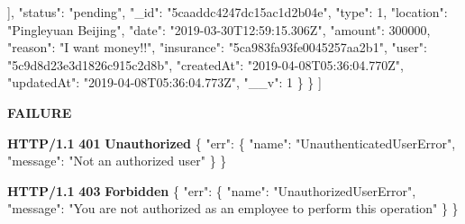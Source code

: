 \documentclass[
]{article}
\newenvironment{Shaded}{}{}
\newcommand{\DataTypeTok}[1]{\textcolor[rgb]{0.56,0.13,0.00}{#1}}
\newcommand{\DecValTok}[1]{\textcolor[rgb]{0.25,0.63,0.44}{#1}}
\newcommand{\ErrorTok}[1]{\textcolor[rgb]{1.00,0.00,0.00}{\textbf{#1}}}
\newcommand{\FunctionTok}[1]{\textcolor[rgb]{0.02,0.16,0.49}{#1}}
\newcommand{\OtherTok}[1]{\textcolor[rgb]{0.00,0.44,0.13}{#1}}
\newcommand{\StringTok}[1]{\textcolor[rgb]{0.25,0.44,0.63}{#1}}
\begin{document}
\begin{Shaded}
\begin{Highlighting}[]
            \OtherTok{]}\FunctionTok{,}
            \DataTypeTok{"status"}\FunctionTok{:} \StringTok{"pending"}\FunctionTok{,}
            \DataTypeTok{"_id"}\FunctionTok{:} \StringTok{"5caaddc4247dc15ac1d2b04e"}\FunctionTok{,}
            \DataTypeTok{"type"}\FunctionTok{:} \DecValTok{1}\FunctionTok{,}
            \DataTypeTok{"location"}\FunctionTok{:} \StringTok{"Pingleyuan Beijing"}\FunctionTok{,}
            \DataTypeTok{"date"}\FunctionTok{:} \StringTok{"2019-03-30T12:59:15.306Z"}\FunctionTok{,}
            \DataTypeTok{"amount"}\FunctionTok{:} \DecValTok{300000}\FunctionTok{,}
            \DataTypeTok{"reason"}\FunctionTok{:} \StringTok{"I want money!!"}\FunctionTok{,}
            \DataTypeTok{"insurance"}\FunctionTok{:} \StringTok{"5ca983fa93fe0045257aa2b1"}\FunctionTok{,}
            \DataTypeTok{"user"}\FunctionTok{:} \StringTok{"5c9d8d23e3d1826c915c2d8b"}\FunctionTok{,}
            \DataTypeTok{"createdAt"}\FunctionTok{:} \StringTok{"2019-04-08T05:36:04.770Z"}\FunctionTok{,}
            \DataTypeTok{"updatedAt"}\FunctionTok{:} \StringTok{"2019-04-08T05:36:04.773Z"}\FunctionTok{,}
            \DataTypeTok{"__v"}\FunctionTok{:} \DecValTok{1}
        \FunctionTok{\}}
    \FunctionTok{\}}
\OtherTok{]}
\end{Highlighting}
\end{Shaded}

\textbf{FAILURE}

\begin{Shaded}
\begin{Highlighting}[]
\ErrorTok{HTTP/1.1} \ErrorTok{401} \ErrorTok{Unauthorized}
\FunctionTok{\{}
    \DataTypeTok{"err"}\FunctionTok{:} \FunctionTok{\{}
        \DataTypeTok{"name"}\FunctionTok{:} \StringTok{"UnauthenticatedUserError"}\FunctionTok{,}
        \DataTypeTok{"message"}\FunctionTok{:} \StringTok{"Not an authorized user"}
    \FunctionTok{\}}
\FunctionTok{\}}
\end{Highlighting}
\end{Shaded}

\begin{Shaded}
\begin{Highlighting}[]
\ErrorTok{HTTP/1.1} \ErrorTok{403} \ErrorTok{Forbidden}
\FunctionTok{\{}
    \DataTypeTok{"err"}\FunctionTok{:} \FunctionTok{\{}
        \DataTypeTok{"name"}\FunctionTok{:} \StringTok{"UnauthorizedUserError"}\FunctionTok{,}
        \DataTypeTok{"message"}\FunctionTok{:} \StringTok{"You are not authorized as an employee to perform this operation"}
    \FunctionTok{\}}
\FunctionTok{\}}
\end{Highlighting}
\end{Shaded}
\end{document}
